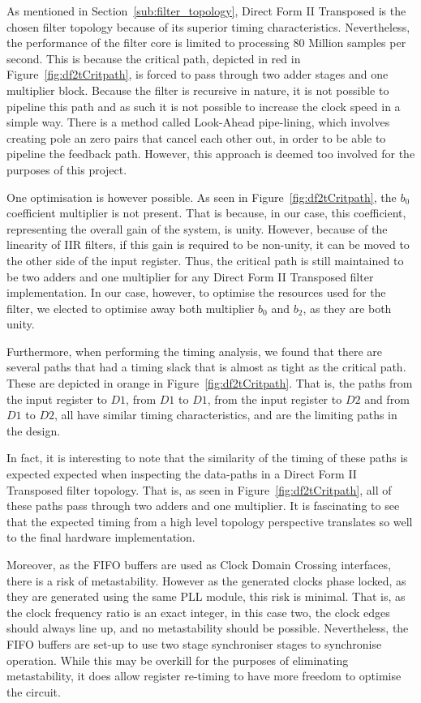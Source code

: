 \documentclass[]{article}
\begin{document}
As mentioned in Section~\ref{sub:filter_topology}, Direct Form II Transposed is the chosen filter topology because of its superior timing characteristics. Nevertheless, the performance of the filter core is limited to processing 80 Million samples per second.
This is because the critical path, depicted in red in Figure~\ref{fig:df2tCritpath}, is forced to pass through two adder stages and one multiplier block.
Because the filter is recursive in nature, it is not possible to pipeline this path and as such it is not possible to increase the clock speed in a simple way. There is a method called Look-Ahead pipe-lining, which involves creating pole an zero pairs that cancel each other out, in order to be able to pipeline the feedback path.
However, this approach is deemed too involved for the purposes of this project.

One optimisation is however possible. As seen in Figure~\ref{fig:df2tCritpath}, the $b_0$ coefficient multiplier is not present. That is because, in our case, this coefficient, representing the overall gain of the system, is unity.
However, because of the linearity of IIR filters, if this gain is required to be non-unity, it can be moved to the other side of the input register.
Thus, the critical path is still maintained to be two adders and one multiplier for any Direct Form II Transposed filter implementation.
In our case, however, to optimise the resources used for the filter, we elected to optimise away both multiplier $b_0$ and $b_2$, as they are both unity.

Furthermore, when performing the timing analysis, we found that there are several paths that had a timing slack that is almost as tight as the critical path. These are depicted in orange in Figure~\ref{fig:df2tCritpath}.
That is, the paths from the input register to $D1$, from $D1$ to $D1$, from the input register to $D2$ and from $D1$ to $D2$, all have similar timing characteristics, and are the limiting paths in the design.

In fact, it is interesting to note that the similarity of the timing of these paths is expected expected when inspecting the data-paths in a Direct Form II Transposed filter topology. That is, as seen in Figure~\ref{fig:df2tCritpath}, all of these paths pass through two adders and one multiplier.
It is fascinating to see that the expected timing from a high level topology perspective translates so well to the final hardware implementation.

Moreover, as the FIFO buffers are used as Clock Domain Crossing interfaces, there is a risk of metastability. However as the generated clocks phase locked, as they are generated using the same PLL module, this risk is minimal.
That is, as the clock frequency ratio is an exact integer, in this case two, the clock edges should always line up, and no metastability should be possible.
Nevertheless, the FIFO buffers are set-up to use two stage synchroniser stages to synchronise operation. While this may be overkill for the purposes of eliminating metastability, it does allow register re-timing to have more freedom to optimise the circuit.  
\end{document}
